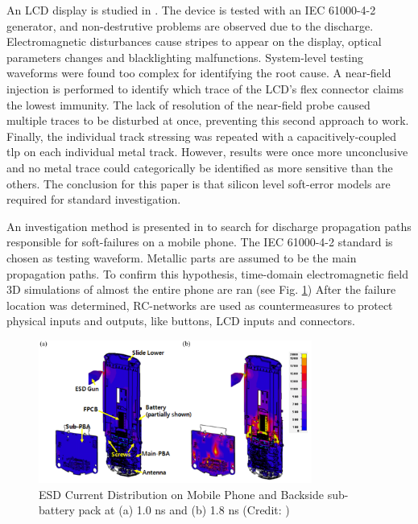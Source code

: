 An LCD display is studied in \cite{softFailLCD}.
The device is tested with an IEC 61000-4-2 \cite{iec61000-4-2} generator, and non-destrutive problems are observed due to the discharge.
Electromagnetic disturbances cause stripes to appear on the display, optical parameters changes and blacklighting malfunctions.
System-level testing waveforms were found too complex for identifying the root cause.
A near-field injection is performed to identify which trace of the LCD's flex connector claims the lowest immunity.
The lack of resolution of the near-field probe caused multiple traces to be disturbed at once, preventing this second approach to work.
Finally, the individual track stressing was repeated with a capacitively-coupled \gls{tlp} on each individual metal track.
However, results were once more unconclusive and no metal trace could categorically be identified as more sensitive than the others.
The conclusion for this paper is that silicon level soft-error models are required for standard investigation.

An investigation method is presented in \cite{softFailMobile} to search for discharge propagation paths responsible for soft-failures on a mobile phone.
The IEC 61000-4-2 standard is chosen as testing waveform.
Metallic parts are assumed to be the main propagation paths.
To confirm this hypothesis, time-domain electromagnetic field 3D simulations of almost the entire phone are ran (see Fig. \ref{fig:mobile-phone-3d-em})
After the failure location was determined, RC-networks are used as countermeasures to protect physical inputs and outputs, like buttons, LCD inputs and connectors.

\begin{figure}[!h]
  \centering
  \includegraphics[width=0.8\textwidth]{src/1/figures/current_distribution_mobile.png}
  \caption{ESD Current Distribution on Mobile Phone and Backside sub-battery pack at (a) 1.0 ns and (b) 1.8 ns (Credit: \cite{softFailMobile})}
  \label{fig:mobile-phone-3d-em}
\end{figure}

